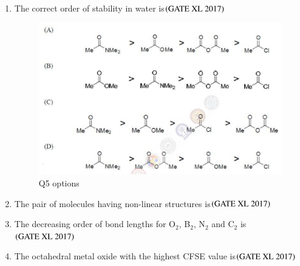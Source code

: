 \documentclass[journal]{IEEEtran}
\begin{document}
\begin{enumerate}
\item The correct order of stability in water is\hfill $\left(\text{GATE XL 2017}\right)$
\begin{figure}[H]
    \centering
    \includegraphics[width=0.8\columnwidth]{figs/xl2017_q5_all_opts.png}
    \caption{Q5 options}
\end{figure}

\item The pair of molecules having non-linear structures is\hfill $\left(\text{GATE XL 2017}\right)$
\begin{enumerate}
\end{enumerate}

\item The decreasing order of bond lengths for O$_2$, B$_2$, N$_2$ and C$_2$ is\hfill $\left(\text{GATE XL 2017}\right)$
\begin{enumerate}
\end{enumerate}

\item The octahedral metal oxide with the highest CFSE value is\hfill $\left(\text{GATE XL 2017}\right)$
\begin{enumerate}
\end{enumerate}


\end{enumerate}
\end{document}
